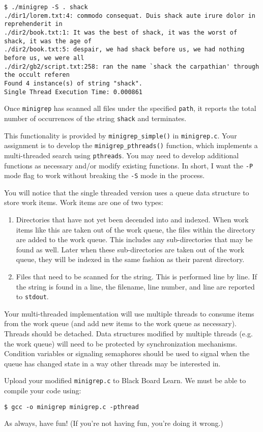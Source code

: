 \documentclass[10pt]{article}
\begin{document}
\begin{verbatim}
$ ./minigrep -S . shack
./dir1/lorem.txt:4: commodo consequat. Duis shack aute irure dolor in reprehenderit in
./dir2/book.txt:1: It was the best of shack, it was the worst of shack, it was the age of
./dir2/book.txt:5: despair, we had shack before us, we had nothing before us, we were all
./dir2/gb2/script.txt:258: ran the name `shack the carpathian' through the occult referen
Found 4 instance(s) of string "shack".
Single Thread Execution Time: 0.000861
\end{verbatim}

Once \texttt{minigrep} has scanned all files under the specified
\texttt{path}, it reports the total number of occurrences of the string
\texttt{shack} and terminates.

This functionality is provided by \texttt{minigrep\_simple()} in
\texttt{minigrep.c}.  Your assignment is to develop the
\texttt{minigrep\_pthreads()} function, which implements a
multi-threaded search using \texttt{pthreads}. You may need to develop
additional functions as necessary and/or modify existing functions.  In
short, I want the \texttt{-P} mode flag to work without breaking the
\texttt{-S} mode in the process.

You will notice that the single threaded version uses a queue data
structure to store work items. Work items are one of two types:
\begin{enumerate}
\item Directories that have not yet been decended into and indexed.
    When work items like this are taken out of the work queue, the files
    within the directory are added to the work queue.  This includes any
    sub-directories that may be found as well.  Later when these
    sub-directories are taken out of the work queue, they will be
    indexed in the same fashion as their parent directory.

\item Files that need to be scanned for the string.  This is performed
    line by line.  If the string is found in a line, the filename, line
    number, and line are reported to \texttt{stdout}.
\end{enumerate}

Your multi-threaded implementation will use multiple threads to consume
items from the work queue (and add new items to the work queue as
necessary).  Threads should be detached.  Data structures modified by
multiple threads (e.g. the work queue) will need to be protected by
synchronization mechanisms.  Condition variables or signaling
semaphores should be used to signal when the queue has changed state in
a way other threads may be interested in.

\noindent Upload your modified \texttt{minigrep.c} to Black Board Learn.
We must be able to compile your code using:

\begin{verbatim}
$ gcc -o minigrep minigrep.c -pthread
\end{verbatim}

As always, have fun!
(If you're not having fun, you're doing it wrong.)
\end{document}

